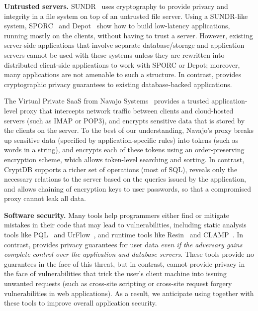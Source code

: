 
{\bf Untrusted servers.}
SUNDR~\cite{li:sundr} uses cryptography to provide privacy and
integrity in a file system on top of an untrusted file server.  Using
a SUNDR-like system, SPORC~\cite{feldman:sporc} and
Depot~\cite{mahajan:depot} show how to build low-latency applications,
running mostly on the clients, without having to trust a server.
However, existing server-side applications that involve separate
database/storage and application servers cannot be used with these
systems unless they are rewritten into distributed client-side
applications to work with SPORC or Depot; moreover, many applications
are not amenable to such a structure.
In contrast, \name{} provides cryptographic privacy guarantees to
existing database-backed applications.


The Virtual Private SaaS from Navajo Systems~\cite{navajo} provides a
trusted application-level proxy that intercepts network traffic between
clients and cloud-hosted servers (such as IMAP or POP3), and encrypts
sensitive data that is stored by the clients on the server.  To the best
of our understanding, Navajo's proxy breaks up sensitive data (specified
by application-specific rules) into tokens (such as words in a string),
and encrypts each of these tokens using an order-preserving encryption
scheme, which allows token-level searching and sorting.  In contrast,
CryptDB supports a richer set of operations (most of SQL), reveals only
the necessary relations to the server based on the queries issued by the
application, and allows chaining of encryption keys to user passwords,
so that a compromised proxy cannot leak all data.

{\bf Software security.}  Many tools help programmers either find or
mitigate mistakes in their code that may lead to vulnerabilities,
including static analysis tools like PQL~\cite{livshits:javasec, martin:pql} and
UrFlow~\cite{chlipala:urflow}, and runtime tools like
Resin~\cite{yip:resin} and CLAMP~\cite{parno:clamp}.
In contrast, \name{} provides privacy guarantees for user data
\textit{even if the adversary gains complete control over the
  application and database servers}.  These tools provide no
guarantees in the face of this threat, but in contrast, \name cannot
provide privacy in the face of vulnerabilities that trick the user's
client machine into issuing unwanted requests (such as cross-site
scripting or cross-site request forgery vulnerabilities in web
applications).  As a result, we anticipate using \name{} together with
these tools to improve overall application security.

